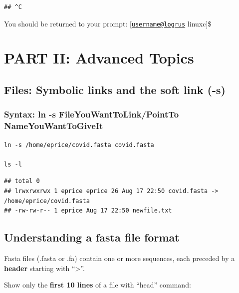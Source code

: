 \documentclass[
]{book}
\begin{document}
\begin{verbatim}
## ^C
\end{verbatim}

You should be returned to your prompt: {[}\href{mailto:username@logrus}{\nolinkurl{username@logrus}} linuxc{]}\$

\hypertarget{part-ii-advanced-topics}{%
\section{PART II: Advanced Topics}\label{part-ii-advanced-topics}}

\hypertarget{files-symbolic-links-and-the-soft-link--s}{%
\subsection{Files: Symbolic links and the soft link (-s)}\label{files-symbolic-links-and-the-soft-link--s}}

\hypertarget{syntax-ln--s-fileyouwanttolinkpointto-nameyouwanttogiveit}{%
\subsubsection*{Syntax: ln -s FileYouWantToLink/PointTo NameYouWantToGiveIt}\label{syntax-ln--s-fileyouwanttolinkpointto-nameyouwanttogiveit}}

\begin{verbatim}
ln -s /home/eprice/covid.fasta covid.fasta

ls -l
\end{verbatim}

\begin{verbatim}
## total 0
## lrwxrwxrwx 1 eprice eprice 26 Aug 17 22:50 covid.fasta -> /home/eprice/covid.fasta 
## -rw-rw-r-- 1 eprice Aug 17 22:50 newfile.txt
\end{verbatim}

\hypertarget{understanding-a-fasta-file-format}{%
\subsection{Understanding a fasta file format}\label{understanding-a-fasta-file-format}}

Fasta files (.fasta or .fa) contain one or more sequences, each preceded by a \textbf{header} starting with ``\textgreater{}''.

Show only the \textbf{first 10 lines} of a file with ``head'' command:
\end{document}

